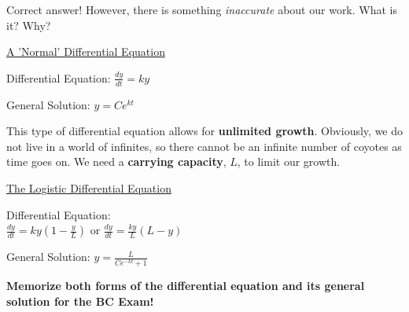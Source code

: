 \documentclass[addpoints, 12pt]{exam}
\begin{document}
Correct answer! However, there is something \textit{inaccurate} about our work. What is it? Why?



\begin{center}
    \underline{A 'Normal' Differential Equation}
\end{center}
\begin{minipage}{0.45\linewidth}
    
        Differential Equation: $\displaystyle\frac{dy}{dt}=ky$
    
\end{minipage}
\hfill
\begin{minipage}{0.45\linewidth}
    
        General Solution: $\displaystyle y=Ce^{kt}$
    
\end{minipage}

This type of differential equation allows for \textbf{unlimited growth}. Obviously, we do not live in a world of infinites, so there cannot be an infinite number of coyotes as time goes on. We need a \textbf{carrying capacity}, $L$, to limit our growth. 


\begin{center}
    \underline{The Logistic Differential Equation}
\end{center}
\begin{minipage}{0.45\linewidth}
    
        Differential Equation:\\ 
        $\displaystyle\frac{dy}{dt}=ky\left(1-\frac{y}{L}\right)$ or $\displaystyle\frac{dy}{dt}=\frac{ky}{L}(L-y)$

\end{minipage}
\hfill
\begin{minipage}{0.45\linewidth}
    
        General Solution: $\displaystyle y=\frac{L}{Ce^{-kt}+1}$
    
\end{minipage}

\vspace{.25in}


\begin{center}
    \textbf{\large Memorize both forms of the differential equation and its general solution for the BC Exam!}
\end{center}


\newpage
\end{document}
